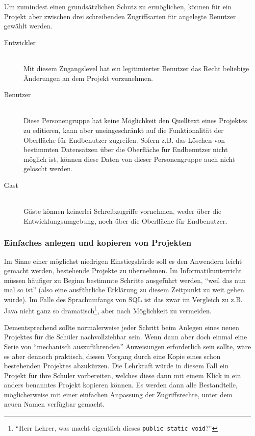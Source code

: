Um zumindest einen grundsätzlichen Schutz zu ermöglichen, können für ein Projekt aber zwischen drei schreibenden Zugriffsarten für angelegte Benutzer gewählt werden.

\begin{description}
  \item[Entwickler] \hfill \\
    Mit diesem Zugangslevel hat ein legitimierter Benutzer das Recht beliebige Änderungen an dem Projekt vorzunehmen.
  \item[Benutzer] \hfill \\
    Diese Personengruppe hat keine Möglichkeit den Quelltext eines Projektes zu editieren, kann aber uneingeschränkt auf die Funktionalität der Oberfläche für Endbenutzer zugreifen. Sofern z.B. das Löschen von bestimmten Datensätzen über die Oberfläche für Endbenutzer nicht möglich ist, können diese Daten von dieser Personengruppe auch nicht gelöscht werden.
  \item[Gast] \hfill \\
    Gäste können keinerlei Schreibzugriffe vornehmen, weder über die Entwicklungsumgebung, noch über die Oberfläche für Endbenutzer.
\end{description}



\subsubsection{Einfaches anlegen und kopieren von Projekten}

Im Sinne einer möglichst niedrigen Einstiegshürde soll es den Anwendern leicht gemacht werden, bestehende Projekte zu übernehmen. Im Informatikunterricht müssen häufiger zu Beginn bestimmte Schritte ausgeführt werden, ``weil das nun mal so ist'' (also eine ausführliche Erklärung zu diesem Zeitpunkt zu weit gehen würde). Im Falle des Sprachumfangs von SQL ist das zwar im Vergleich zu z.B. Java nicht ganz so dramatisch\footnote{``Herr Lehrer, was macht eigentlich dieses \texttt{public static void}?''}, aber nach Möglichkeit zu vermeiden.

Dementsprechend sollte normalerweise jeder Schritt beim Anlegen eines neuen Projektes für die Schüler nachvollziehbar sein. Wenn dann aber doch einmal eine Serie von ``mechanisch auszuführenden'' Anweisungen erforderlich sein sollte, wäre es aber dennoch praktisch, diesen Vorgang durch eine Kopie eines schon bestehenden Projektes abzukürzen. Die Lehrkraft würde in diesem Fall ein Projekt für ihre Schüler vorbereiten, welches diese dann mit einem Klick in ein anders benanntes Projekt kopieren können. Es werden dann alle Bestandteile, möglicherweise mit einer einfachen Anpassung der Zugriffsrechte, unter dem neuen Namen verfügbar gemacht.

